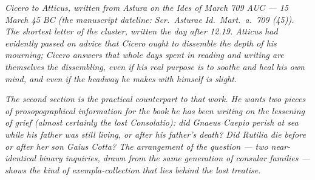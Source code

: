 
\textit{Cicero to Atticus, written from Astura on
the Ides of March 709 AUC --- 15 March 45 BC (the
manuscript dateline: \textit{Scr.\ Asturae Id.\
Mart.\ a.\ 709 (45)}). The shortest letter of the
cluster, written the day after 12.19. Atticus had
evidently passed on advice that Cicero ought to
\textit{dissemble} the depth of his mourning; Cicero
answers that whole days spent in reading and writing
are themselves the dissembling, even if his real
purpose is to soothe and heal his own mind, and even
if the headway he makes with himself is slight.}

\textit{The second section is the practical
counterpart to that work. He wants two pieces of
prosopographical information for the book he has
been writing on the lessening of grief (almost
certainly the lost \textit{Consolatio}): did Gnaeus
Caepio perish at sea while his father was still
living, or after his father's death? Did Rutilia
die before or after her son Gaius Cotta? The
arrangement of the question --- two near-identical
binary inquiries, drawn from the same generation
of consular families --- shows the kind of
exempla-collection that lies behind the lost
treatise.}
